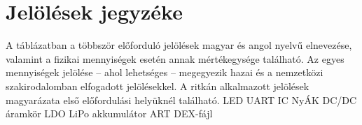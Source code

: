 \documentclass[12pt,a4paper]{article}
\begin{document}
\thispagestyle{plain}
\section*{Jelölések jegyzéke}

A táblázatban a többször előforduló jelölések magyar és angol nyelvű elnevezése, valamint a fizikai mennyiségek esetén annak mértékegysége található. Az egyes mennyiségek jelölése – ahol lehetséges – megegyezik hazai és a nemzetközi szakirodalomban elfogadott jelölésekkel. A ritkán alkalmazott jelölések magyarázata első előfordulási helyüknél található.
LED
UART
IC
NyÁK
DC/DC áramkör
LDO
LiPo akkumulátor
ART
DEX-fájl


\newpage

\thispagestyle{fancy}

\thispagestyle{fancy}

\newpage

%

    \thispagestyle{fancy}
    
    
    
    
    
    
    
    
    
    
    \newpage


% 
\end{document}
